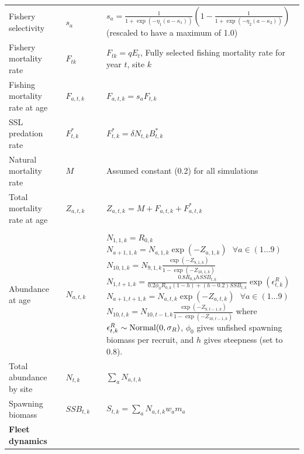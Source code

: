 \documentclass[nonumbib,leqno]{nrc1}
\begin{document}
\begin{longtable}{p{4cm}lll p{8cm}}
Fishery selectivity  & & $s_a$ & &  $s_a = \frac{1}{1+\exp(-\eta_1(a-\kappa_1))} \left( 1- \frac{1}{1+\exp(-\eta_2(a-\kappa_2))} \right)$ (rescaled to have a maximum of 1.0)\\

Fishery mortality rate & & $F_{tk}$ & & $F_{tk}=q E_t$, Fully selected fishing mortality rate for year $t$, site $k$\\

Fishing mortality rate at age & & $F_{a,t,k}$ & & $F_{a,t,k}=s_a F_{t,k}$ \\

SSL predation rate  & & $F_{t,k}^*$ & & $F_{t,k}^*=\delta N_{t,k} B_{t,k}^*$ \\

Natural mortality rate & & $M$ & & Assumed constant (0.2) for all simulations \\

Total mortality rate at age & & $Z_{a,t,k}$ & & $Z_{a,t,k}=M+F_{a,t,k}+F_{a,t,k}^*$ \\[2pt]
\\

Abundance at age & & $N_{a,t,k}$ & & $N_{1,1,k} = R_{0,k}$ \newline
$N_{a+1,1,k}=N_{a,1,k}\exp(-Z_{a,1,k})~~~\forall a \in (1\ldots 9)$ \newline
$N_{10,1,k}=N_{9,1,k} \frac{\exp( -Z_{9,1,k})} {1-\exp (-Z_{10,1,k})}$ \newline
$N_{1,t+1,k}=\frac{0.8 R_{0,k} h SSB_{t,k}} {0.2\phi_0 R_{0,k} (1-h)+(h-0.2)SSB_{t,k}}
  \exp(\epsilon_{t,k}^R)$ \newline
$N_{a+1,t+1,k}=N_{a,t,k}\exp(-Z_{a,t,k})~~~\forall a \in (1\ldots 9)$ \newline
$N_{10,t,k}=N_{10,t-1,k} \frac{\exp( -Z_{9,t-1,k})}{1-\exp (-Z_{10,t-1,k})}$ \newline
where $\epsilon_{t,k}^R \sim {\rm Normal}(0,\sigma_R)$, $\phi_0$ gives unfished spawning biomass per recruit, and $h$ gives steepness (set to 0.8).  \\[2pt]

Total abundance by site & & $N_{t,k}$ & & $ \sum_a N_{a,t,k}$ \\

Spawning biomass & & $SSB_{t,k}$ & & $S_{t,k}=\sum_a N_{a,t,k} w_a m_a$ \\

\midrule

\multicolumn{1}{l}{\textbf{Fleet dynamics}}\\


\end{longtable}
\end{document}
